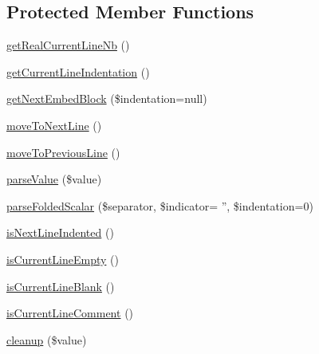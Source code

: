 \subsection*{\-Protected \-Member \-Functions}
\begin{DoxyCompactItemize}
\item 
\hyperlink{class_symfony_1_1_component_1_1_yaml_1_1_parser_afed732413dcd90e7e27f15f9a693a933}{get\-Real\-Current\-Line\-Nb} ()
\item 
\hyperlink{class_symfony_1_1_component_1_1_yaml_1_1_parser_afab1ea78369d49700e8269645a560ebe}{get\-Current\-Line\-Indentation} ()
\item 
\hyperlink{class_symfony_1_1_component_1_1_yaml_1_1_parser_a094d72cd70df641bbb7c4d87647e7afe}{get\-Next\-Embed\-Block} (\$indentation=null)
\item 
\hyperlink{class_symfony_1_1_component_1_1_yaml_1_1_parser_a23295181488f2269374ba055ab73f133}{move\-To\-Next\-Line} ()
\item 
\hyperlink{class_symfony_1_1_component_1_1_yaml_1_1_parser_a793efbbdb80289712c6d8b13974a0794}{move\-To\-Previous\-Line} ()
\item 
\hyperlink{class_symfony_1_1_component_1_1_yaml_1_1_parser_a090d97f0d830c8a3a6d4962636b9081b}{parse\-Value} (\$value)
\item 
\hyperlink{class_symfony_1_1_component_1_1_yaml_1_1_parser_aca51709db86f3336fa0cd8773cc791d0}{parse\-Folded\-Scalar} (\$separator, \$indicator= '', \$indentation=0)
\item 
\hyperlink{class_symfony_1_1_component_1_1_yaml_1_1_parser_a007cdf42dc438be788d23206f14e7396}{is\-Next\-Line\-Indented} ()
\item 
\hyperlink{class_symfony_1_1_component_1_1_yaml_1_1_parser_ae7bb7c2fd370a72c6f119b53ee64eb82}{is\-Current\-Line\-Empty} ()
\item 
\hyperlink{class_symfony_1_1_component_1_1_yaml_1_1_parser_a071146be0626e2ff9537f3b741b511d6}{is\-Current\-Line\-Blank} ()
\item 
\hyperlink{class_symfony_1_1_component_1_1_yaml_1_1_parser_af9c00798454b2a4b7c360c3bba9f6b10}{is\-Current\-Line\-Comment} ()
\item 
\hyperlink{class_symfony_1_1_component_1_1_yaml_1_1_parser_a6d462f56da02d7670e368941d918f074}{cleanup} (\$value)
\end{DoxyCompactItemize}
